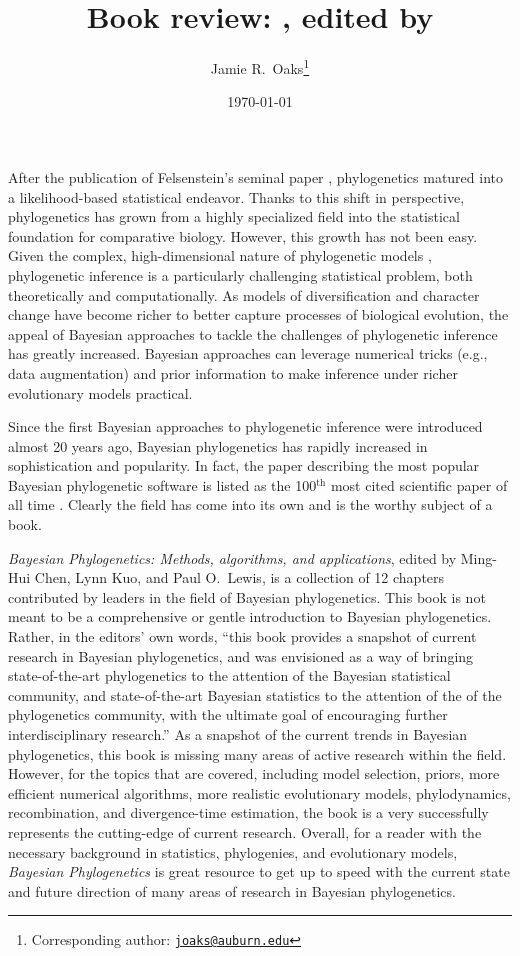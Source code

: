 \documentclass[letterpaper,12pt]{article}
\title{Book review: \bookfulltitle, edited by \editors}
\author[1,2]{Jamie R.\ Oaks\thanks{Corresponding author: \href{mailto:joaks@auburn.edu}{\tt joaks@auburn.edu}}}
\affil[1]{Department of Biology, University of Washington, Seattle, Washington 98195}
\affil[2]{Department of Biological Sciences, Auburn University, Auburn, Alabama 36849}
\date{\today}
\newcommand{\super}[1]{\ensuremath{^{\textrm{#1}}}}
\newcommand{\booktitle}{\textit{Bayesian Phylogenetics}\xspace}
\newcommand{\booksubtitle}{\textit{Methods, algorithms, and applications}\xspace}
\newcommand{\bookfulltitle}{\textit{\booktitle: \booksubtitle}\xspace}
\newcommand{\editors}{Ming-Hui Chen, Lynn Kuo, and Paul O.\ Lewis\xspace}
\begin{document}
\maketitle

\newpage
\doublespacing

After the publication of Felsenstein's seminal paper \citep{Felsenstein1981},
phylogenetics matured into a likelihood-based statistical endeavor.
Thanks to this shift in perspective, phylogenetics has grown from a highly
specialized field into the statistical foundation for comparative biology.
However, this growth has not been easy.
Given the complex, high-dimensional nature of phylogenetic models
\citep{Kim2000}, phylogenetic inference is a particularly challenging
statistical problem, both theoretically and computationally. 
As models of diversification and character change have become richer to better
capture processes of biological evolution, the appeal of Bayesian approaches to
tackle the challenges of phylogenetic inference has greatly increased.
Bayesian approaches can leverage numerical tricks (e.g., data augmentation) and
prior information to make inference under richer evolutionary models practical.

Since the first Bayesian approaches to phylogenetic inference were introduced
\citep{Rannala1996,Mau1997} almost 20 years ago, Bayesian phylogenetics has
rapidly increased in sophistication and popularity.
In fact, the paper describing the most popular Bayesian phylogenetic software
\citep{Ronquist2003} is listed as the 100\super{th} most cited scientific paper
of all time \citep{VanNoorden2014}.
Clearly the field has come into its own and is the worthy subject of a book.

\bookfulltitle, edited by \editors \citep{Chen2014}, is a collection of 12
chapters contributed by leaders in the field of Bayesian phylogenetics.
This book is not meant to be a comprehensive or gentle introduction to Bayesian
phylogenetics.
Rather, in the editors' own words, ``this book provides a snapshot of current
research in Bayesian phylogenetics, and was envisioned as a way of bringing
state-of-the-art phylogenetics to the attention of the Bayesian statistical
community, and state-of-the-art Bayesian statistics to the attention of the of
the phylogenetics community, with the ultimate goal of encouraging further
interdisciplinary research.''
As a snapshot of the current trends in Bayesian phylogenetics, this book is
missing many areas of active research within the field.
However, for the topics that are covered, including model selection, priors,
more efficient numerical algorithms, more realistic evolutionary models,
phylodynamics, recombination, and divergence-time estimation, 
the book is a very successfully represents the cutting-edge of current research.
Overall, for a reader with the necessary background in statistics, phylogenies,
and evolutionary models, \booktitle is great resource to get up to speed with
the current state and future direction of many areas of research in Bayesian
phylogenetics.
\end{document}
